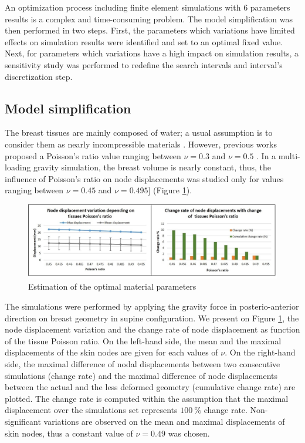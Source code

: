  
 An optimization process including finite element simulations with 6 parameters results is a complex and time-consuming problem. The model simplification was then performed in two steps. First, the parameters which variations have limited effects on simulation results were identified and set to an optimal fixed value. Next, for parameters which variations have a high impact on simulation results, a sensitivity study was performed to redefine the search intervals and interval's discretization step.
 
 \subsection{Model simplification}

The breast tissues are mainly composed of water; a usual assumption is to consider them as nearly incompressible materials \citep{fung_biomechanics_2013}. However,
previous works proposed a Poisson's ratio value ranging between $\nu = 0.3$ \citep{hopp_automatic_2013} and $\nu = 0.5$ \citep{gamage_modelling_2012}. In a multi-loading gravity simulation, the breast volume is nearly constant, thus, the influence of Poisson's ratio on node displacements was studied only for values ranging between $\nu = 0.45$ and $\nu = 0.495]$ (Figure \ref{fig:poissonRatio}). 

\begin{figure}[!h]
\centering
\includegraphics[width=\textwidth,keepaspectratio]{figures/poissonRatio.jpg} 
\caption{Estimation of the optimal material parameters}\label{fig:poissonRatio}
\end{figure}

The simulations were performed by applying the gravity force in posterio-anterior direction on breast geometry in supine configuration. We present on Figure \ref{fig:poissonRatio}, the node displacement variation and the change rate of node displacement as function of the tissue Poisson ratio. On the left-hand side, the mean and the maximal displacements of the skin nodes are given for each values of $\nu$. On the right-hand side, the maximal difference of nodal displacements between two consecutive simulations (change rate) and the maximal difference of node displacements between the actual and the less deformed geometry (cumulative change rate) are plotted. The change rate is computed within the assumption that the maximal displacement over the simulations set represents $100\ \%$ change rate. Non-significant variations are observed on the mean and maximal displacements of skin nodes, thus a constant value of $\nu = 0.49$ was chosen.


